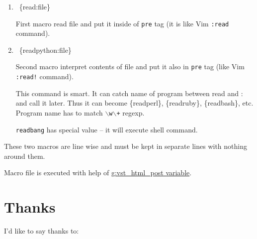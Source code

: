 \documentclass[12pt]{article}
\begin{document}
\begin{enumerate}[label=\arabic*.]
\item
\begin{ttfamily}\begin{flushleft}
\mbox{~\{read:file\}}\\
\end{flushleft}\end{ttfamily}

 First macro read file and put it inside of \texttt{pre} tag (it is like Vim
 \texttt{:read} command).

\item
\begin{ttfamily}\begin{flushleft}
\mbox{~\{readpython:file\}}\\
\end{flushleft}\end{ttfamily}

 Second \hypertarget{lmacro}{macro} interpret contents of file and put it also in \texttt{pre} tag
 (like Vim \texttt{:read!} command).

 This command is smart. It can catch name of program between read and : and
 call it later. Thus it can become \{readperl\}, \{readruby\}, \{readbash\}, etc.
 Program name has to match \texttt{$\backslash$w$\backslash$+} regexp.

 \texttt{readbang} has special value -- it will execute shell command.

 \begin{center}
\end{center}
\end{enumerate}

These two macros are line wise and must be kept in separate lines with
nothing around them.

Macro file is executed with help of \href{\#lvhp}{g:vst\_html\_post variable}.

\hypertarget{lthanks}{}
\section{Thanks}

I'd like to say thanks to:
\end{document}
